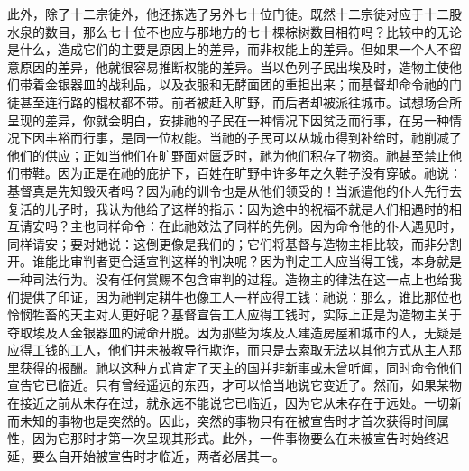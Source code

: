 此外，除了十二宗徒外，他还拣选了另外七十位门徒。既然十二宗徒对应于十二股水泉的数目，那么七十位不也应与那地方的七十棵棕树数目相符吗？比较中的无论是什么，造成它们的主要是原因上的差异，而非权能上的差异。但如果一个人不留意原因的差异，他就很容易推断权能的差异。当以色列子民出埃及时，造物主使他们带着金银器皿的战利品，以及衣服和无酵面团的重担出来；而基督却命令祂的门徒甚至连行路的棍杖都不带。前者被赶入旷野，而后者却被派往城市。试想场合所呈现的差异，你就会明白，安排祂的子民在一种情况下因贫乏而行事，在另一种情况下因丰裕而行事，是同一位权能。当祂的子民可以从城市得到补给时，祂削减了他们的供应；正如当他们在旷野面对匮乏时，祂为他们积存了物资。祂甚至禁止他们带鞋。因为正是在祂的庇护下，百姓在旷野中许多年之久鞋子没有穿破。祂说：基督真是先知毁灭者吗？因为祂的训令也是从他们领受的！当派遣他的仆人先行去复活的儿子时，我认为他给了这样的指示：因为途中的祝福不就是人们相遇时的相互请安吗？主也同样命令：在此祂效法了同样的先例。因为命令他的仆人遇见时，同样请安；要对她说：这倒更像是我们的；它们将基督与造物主相比较，而非分割开。谁能比审判者更合适宣判这样的判决呢？因为判定工人应当得工钱，本身就是一种司法行为。没有任何赏赐不包含审判的过程。造物主的律法在这一点上也给我们提供了印证，因为祂判定耕牛也像工人一样应得工钱：祂说：那么，谁比那位也怜悯牲畜的天主对人更好呢？基督宣告工人应得工钱时，实际上正是为造物主关于夺取埃及人金银器皿的诫命开脱。因为那些为埃及人建造房屋和城市的人，无疑是应得工钱的工人，他们并未被教导行欺诈，而只是去索取无法以其他方式从主人那里获得的报酬。祂以这种方式肯定了天主的国并非新事或未曾听闻，同时命令他们宣告它已临近。只有曾经遥远的东西，才可以恰当地说它变近了。然而，如果某物在接近之前从未存在过，就永远不能说它已临近，因为它从未存在于远处。一切新而未知的事物也是突然的。因此，突然的事物只有在被宣告时才首次获得时间属性，因为它那时才第一次呈现其形式。此外，一件事物要么在未被宣告时始终迟延，要么自开始被宣告时才临近，两者必居其一。\par

